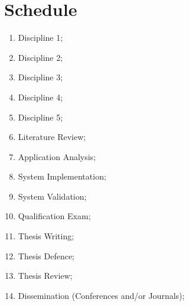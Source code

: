 \documentclass[
	12pt,				%
	oneside,			%
	a4paper,			%
	brazil,			    %
	french,				%
	spanish,			%
	english,			%
	]{abntex2}
\begin{document}
        
\section{Schedule} \label{sec:scheadule}
\begin{enumerate}
	\item Discipline 1; %
	\item Discipline 2; %
	\item Discipline 3; %
	\item Discipline 4; %
	\item Discipline 5; %
	\item Literature Review; %
	\item Application Analysis; %
	\item System Implementation; %
	\item System Validation; %
	\item Qualification Exam; %
	\item Thesis Writing; %
	\item Thesis Defence; %
	\item Thesis Review; %
	\item Dissemination (Conferences and/or Journals); %
\end{enumerate}
\end{document}
